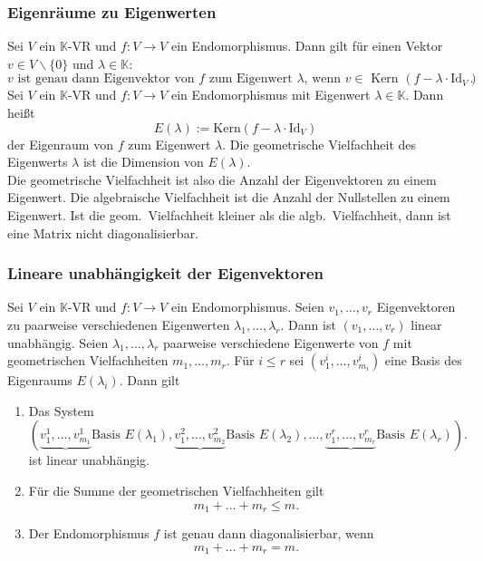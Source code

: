 \documentclass[a4paper,12pt]{article}
\begin{document}
\subsubsection{Eigenräume zu Eigenwerten}
Sei $V$ ein $\mathbb{K}$-VR und $f:V\rightarrow V$ ein Endomorphismus. Dann gilt für einen Vektor $v \in V\backslash\{0\}$ und $\lambda  \in \mathbb{K}$:
\[ 
        v\text{ ist genau dann Eigenvektor von $f$ zum Eigenwert $\lambda $, wenn $v \in $ Kern $\left(f-\lambda \cdot \text{Id}_V\right)$ }
.\] 
Sei $V$ ein $\mathbb{K}$-VR und $f:V\rightarrow V$ ein Endomorphismus mit Eigenwert $\lambda  \in \mathbb{K}$. Dann heißt
\[ 
        E\left(\lambda \right):=\text{Kern}\left(f-\lambda \cdot \text{Id}_V\right)
\] 
der Eigenraum von $f$ zum Eigenwert $\lambda $. Die geometrische Vielfachheit des Eigenwerts $\lambda $ ist die Dimension von $E\left(\lambda \right)$.\\\indent
Die geometrische Vielfachheit ist also die Anzahl der Eigenvektoren zu einem Eigenwert. Die algebraische Vielfachheit ist die Anzahl der Nullstellen zu einem Eigenwert. Ist die geom.\ Vielfachheit kleiner als die algb.\ Vielfachheit, dann ist eine Matrix nicht diagonalisierbar.

\subsubsection{Lineare unabhängigkeit der Eigenvektoren}
Sei $V$ ein $\mathbb{K}$-VR und $f:V\rightarrow V$ ein Endomorphismus. Seien $v_1,\hdots ,v_r$ Eigenvektoren zu paarweise verschiedenen Eigenwerten $\lambda _1,\hdots ,\lambda _r$. Dann ist $\left(v_1,\hdots ,v_r\right)$ linear unabhängig. Seien $\lambda _1,\hdots ,\lambda _r$ paarweise verschiedene Eigenwerte von $f$ mit geometrischen Vielfachheiten $m_1,\hdots ,m_r$. Für $i\leq r$ sei $\left(v_1^i,\hdots ,v_{m_i}^i\right)$ eine Basis des Eigenraums $E\left(\lambda _i\right)$. Dann gilt
\begin{enumerate}[label=(\alph*)]
        \item Das System 
                \[ 
                        \left(\underbrace{v_1^1,\hdots ,v_{m_1}^1}{\text{Basis }E\left(\lambda _1\right)},\underbrace{v_1^2,\hdots ,v_{m_2}^2}{\text{Basis }E\left(\lambda _2\right)},\hdots ,\underbrace{v_1^r,\hdots ,v_{m_r}^r}{\text{Basis }E\left(\lambda _r\right)}\right)
                .\] 
                ist linear unabhängig.
        \item Für die Summe der geometrischen Vielfachheiten gilt
                \[ 
                        m_1+\hdots +m_r\leq m
                .\] 
        \item Der Endomorphismus $f$ ist genau dann diagonalisierbar, wenn
                \[ 
                        m_1+\hdots +m_r=m
                .\] 
\end{enumerate}
\end{document}
